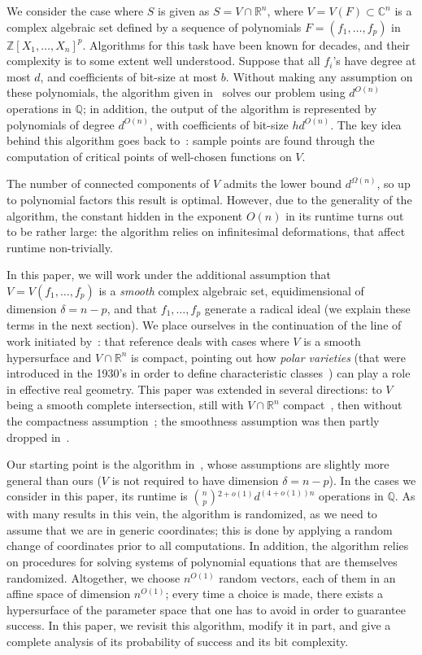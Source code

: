 \documentclass[12pt]{article}
\newcommand{\ZZ}{{\mathbb{Z}}}
\def\C{\mathbb{C}}
\def\Q{\mathbb{Q}}
\def\R{\mathbb{R}}
\begin{document}
We consider the case where $S$ is given as $S=V \cap \R^n$, where
$V=V(F) \subset \C^n$ is a complex algebraic set defined by a sequence
of polynomials $F = (f_1,\hdots,f_p)$ in
$\ZZ[X_1,\dots,X_n]^p$. Algorithms for this task have been known for
decades, and their complexity is to some extent well
understood. Suppose that all $f_i$'s have degree at most $d$, and
coefficients of bit-size at most $b$. Without making any assumption on
these polynomials, the algorithm given
in~\cite[Section~13.1]{BaPoRo03} solves our problem using $d^{O(n)}$
operations in $\Q$; in addition, the output of the algorithm is
represented by polynomials of degree $d^{O(n)}$, with coefficients of
bit-size $hd^{O(n)}$. The key idea behind this algorithm goes back
to~\cite{GrVo88}: sample points are found through the computation of
critical points of well-chosen functions on $V$.

The number of connected components of $V$ admits the lower bound
$d^{\Omega(n)}$, so up to polynomial factors this result is
optimal. However, due to the generality of the algorithm, the constant
hidden in the exponent $O(n)$ in its runtime turns out to be rather
large: the algorithm relies on infinitesimal deformations, that affect
runtime non-trivially.

In this paper, we will work under the additional assumption that
$V=V(f_1,\dots,f_p)$ is a {\em smooth} complex algebraic set,
equidimensional of dimension $\delta=n-p$, and that $f_1,\dots,f_p$
generate a radical ideal (we explain these terms in the next
section). We place ourselves in the continuation of the line of work
initiated by~\cite{BaGiHeMb97}: that reference deals with cases where
$V$ is a smooth hypersurface and $V \cap \R^n$ is compact, pointing
out how {\em polar varieties} (that were introduced in the 1930's in
order to define characteristic classes~\cite{Piene78,Teissier88}) can
play a role in effective real geometry. This paper was extended in
several directions: to $V$ being a smooth complete intersection, still
with $V\cap \R^n$ compact~\cite{BaGiHeMb01}, then without the
compactness assumption~\cite{EMP,BaGiHePa05}; the smoothness
assumption was then partly dropped in~\cite{BaGiHe14,BaGiHeLePa12}.

Our starting point is the algorithm in~\cite{EMP}, whose assumptions
are slightly more general than ours ($V$ is not required to have
dimension $\delta=n-p$). In the cases we consider in this paper, its
runtime is ${ n \choose p}{}^{2+o(1)}d^{(4+o(1))n}$ operations in
$\Q$.  As with many results in this vein, the algorithm is randomized,
as we need to assume that we are in generic coordinates; this is done
by applying a random change of coordinates prior to all
computations. In addition, the algorithm relies on procedures for
solving systems of polynomial equations that are themselves
randomized.  Altogether, we choose $n^{O(1)}$ random vectors, each of
them in an affine space of dimension $n^{O(1)}$; every time a choice
is made, there exists a hypersurface of the parameter space that one
has to avoid in order to guarantee success. In this paper, we revisit
this algorithm, modify it in part, and give a complete analysis of its
probability of success and its bit complexity.
\end{document}
